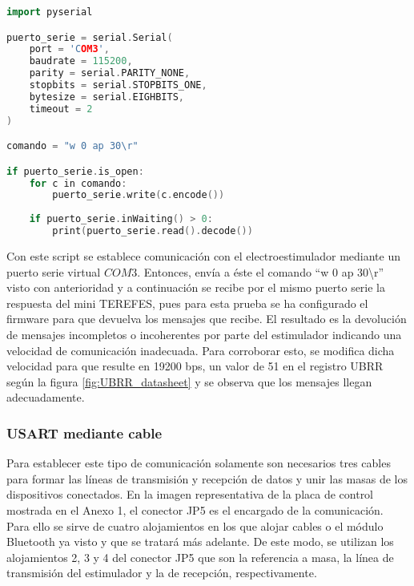 \begin{lstlisting}[language=C++,breaklines]
import pyserial

puerto_serie = serial.Serial(
	port = 'COM3',
	baudrate = 115200,
	parity = serial.PARITY_NONE,
	stopbits = serial.STOPBITS_ONE,
	bytesize = serial.EIGHBITS,
	timeout = 2
)

comando = "w 0 ap 30\r"

if puerto_serie.is_open:
	for c in comando:
		puerto_serie.write(c.encode())
		
	if puerto_serie.inWaiting() > 0:
		print(puerto_serie.read().decode())	
\end{lstlisting}

Con este script se establece comunicación con el electroestimulador mediante un puerto serie virtual $COM3$. Entonces, envía a éste el comando ``w 0 ap 30\textbackslash r'' visto con anterioridad y a continuación se recibe por el mismo puerto serie la respuesta del mini TEREFES, pues para esta prueba se ha configurado el firmware para que devuelva los mensajes que recibe. El resultado es la devolución de mensajes incompletos o incoherentes por parte del estimulador indicando una velocidad de comunicación inadecuada. Para corroborar esto, se modifica dicha velocidad para que resulte en 19200 bps, un valor de 51 en el registro UBRR según la figura \ref{fig:UBRR_datasheet} y se observa que los mensajes llegan adecuadamente. 

\subsubsection{USART mediante cable}
Para establecer este tipo de comunicación solamente son necesarios tres cables para formar las líneas de transmisión y recepción de datos y unir las masas de los dispositivos conectados. En la imagen representativa de la placa de control mostrada en el Anexo 1, el conector JP5 es el encargado de la comunicación. Para ello se sirve de cuatro alojamientos en los que alojar cables o el módulo Bluetooth ya visto y que se tratará más adelante. De este modo, se utilizan los alojamientos 2, 3 y 4 del conector JP5 que son la referencia a masa, la línea de transmisión del estimulador y la de recepción, respectivamente.

